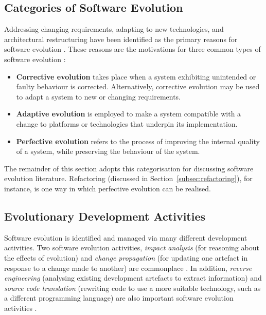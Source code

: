 \subsection{Categories of Software Evolution}
\label{subsec:categories_of_software_evolution}
Addressing \cc changing requirements, adapting to new technologies, and architectural restructuring have been identified as the primary reasons for software evolution \cite{sjoberg93quantifying}. These reasons are the motivations for three common types of software evolution \cite[ch. 21]{sommerville06software}:

\begin{itemize}
 \item \textbf{Corrective evolution} takes place when a system exhibiting unintended or faulty behaviour is corrected. Alternatively, corrective evolution may be used to adapt a system to new or changing requirements. 
 \item \textbf{Adaptive evolution} is employed to make a system compatible with a change to platforms or technologies that underpin its implementation.
 \item \textbf{Perfective evolution} refers to the process of improving the internal quality of a system, while preserving the behaviour of the system. 
\end{itemize}

The remainder of this section adopts this categorisation for discussing software evolution literature. Refactoring (discussed in Section~\ref{subsec:refactoring}), for instance, is one way in which perfective evolution can be realised.

\subsection{Evolutionary Development Activities}
Software evolution is identified and managed via many different development activities. Two \cc software evolution activities, \emph{impact analysis} (for reasoning about the effects of evolution) and \emph{change propagation} (for updating one artefact in response to a change made to another) are commonplace \cite{winkler09survey}. In \cc addition, \emph{reverse engineering} (analysing existing development artefacts to extract information) and \emph{source code translation} (rewriting code to use a more suitable technology, such as a different programming language) are also important software evolution activities \cite{sommerville06software}.

